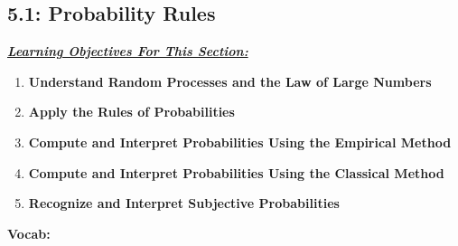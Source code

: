\documentclass{report}
\begin{document}
    \subsection{5.1: Probability Rules}
    \bigbreak \noindent 
    \textbf{\textit{\underline{Learning Objectives For This Section:}}}
    \begin{enumerate}
        \item \textbf{Understand Random Processes and the Law of Large Numbers}
        \item \textbf{Apply the Rules of Probabilities}
        \item \textbf{Compute and Interpret Probabilities Using the Empirical Method}
        \item \textbf{Compute and Interpret Probabilities Using the Classical Method}
        \item \textbf{Recognize and Interpret Subjective Probabilities}
    \end{enumerate}
    \bigbreak \noindent 
    \textbf{Vocab:}
\end{document}
